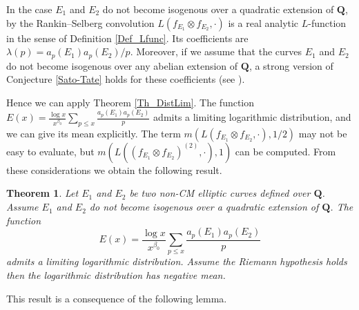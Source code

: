 \documentclass[a4paper,10pt]{amsart}
\theoremstyle{plain}
\newtheorem{theo}{Theorem}[section]
\theoremstyle{definition}
\begin{document}
In the case $E_{1}$ and $E_{2}$  do not become isogenous over a quadratic extension of $\mathbf{Q}$, by \cite{Ramakrishnan}
the Rankin--Selberg convolution $L(f_{E_{1}}\otimes f_{E_{2}},\cdot)$
is a real analytic $L$-function in the sense of Definition \ref{Def_Lfunc}.
Its coefficients are $\lambda(p) = a_{p}(E_{1})a_{p}(E_{2})/p$.
Moreover, if we assume that the curves $E_{1}$ and $E_{2}$  do not become isogenous over any abelian extension of $\mathbf{Q}$,
a strong version of Conjecture \ref{Sato-Tate} holds for these coefficients (see \cite[Th. 5.4]{HarrisAutEC}). 

Hence we can apply Theorem \ref{Th_DistLim}.
The function
$E(x)= \frac{\log x}{x^{\beta_{0}}} \sum_{p\leq x}\frac{a_{p}(E_{1})a_{p}(E_{2})}{p}$
admits a limiting logarithmic distribution,
and we can give its mean explicitly.
The term
$m(L(f_{E_{1}}\otimes f_{E_{2}},\cdot),1/2)$ may not be easy to evaluate,
but 
$m(L((f_{E_{1}}\otimes f_{E_{2}})^{(2)},\cdot),1)$ can be computed.
From these considerations we obtain the following result.

\begin{theo}\label{Prop_CorrEllcurves}
Let $E_{1}$ and $E_{2}$ be two non-CM elliptic curves defined over $\mathbf{Q}$.
Assume $E_{1}$ and $E_{2}$  do not become isogenous over a quadratic extension of $\mathbf{Q}$.
The function $$E(x)= \frac{\log x}{x^{\beta_{0}}} \sum_{p\leq x}\frac{a_{p}(E_{1})a_{p}(E_{2})}{p}$$
admits a limiting logarithmic distribution.
Assume the Riemann hypothesis holds then the logarithmic distribution has negative mean.
\end{theo}

This result is a consequence of the following lemma.
\end{document}
